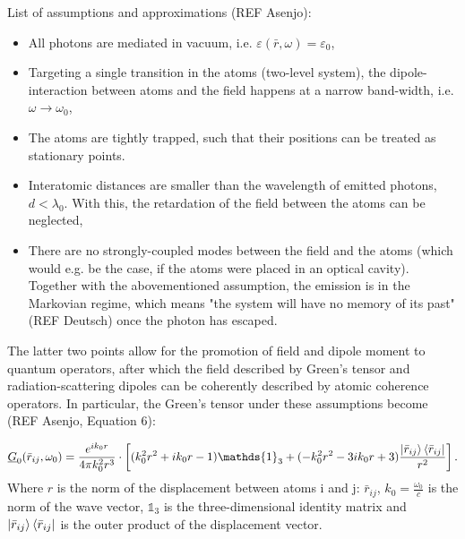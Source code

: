 \documentclass{article}
\begin{document}
List of assumptions and approximations (REF Asenjo):
\begin{itemize}\label{list:assumptions}
    \item All photons are mediated in vacuum, i.e. $\varepsilon(\bar{r},\omega) = \varepsilon_0$,
    \item Targeting a single transition in the atoms (two-level system), the dipole-interaction between atoms and the field happens at a narrow band-width, i.e. $\omega \rightarrow \omega_0$,
    \item The atoms are tightly trapped, such that their positions can be treated as stationary points. 
    \item Interatomic distances are smaller than the wavelength of emitted photons, $d < \lambda_0$. With this, the retardation of the field between the atoms can be neglected, 
    \item There are no strongly-coupled modes between the field and the atoms (which would e.g. be the case, if the atoms were placed in an optical cavity). Together with the abovementioned assumption, the emission is in the Markovian regime, which means "the system will have no memory of its past" (REF Deutsch) once the photon has escaped. 
\end{itemize}
The latter two points allow for the promotion of field and dipole moment to quantum operators, after which the field described by Green's tensor and radiation-scattering dipoles can be coherently described by atomic coherence operators. In particular, the Green's tensor under these assumptions become (REF Asenjo, Equation 6):

\begin{equation}\label{eq:Greens}
    \underline{G}_0 (\bar{r}_{ij}, \omega_0) = \frac{e^{ik_0r}}{4\pi k_0^2 r^3} \cdot \left[ (k_0^2r^2 + ik_0r - 1) \mathds{1}_3 + (-k_0^2 r^2 -3ik_0r + 3) \frac{\ket{\bar{r}_{ij}}\bra{\bar{r}_{ij}}}{r^2} \right].
\end{equation}
Where $r$ is the norm of the displacement between atoms i and j: $\bar{r}_{ij}$, $k_0=\frac{\omega_0}{c}$ is the norm of the wave vector, $\mathds{1}_3$ is the three-dimensional identity matrix and $\ket{\bar{r}_{ij}}\bra{\bar{r}_{ij}}$ is the outer product of the displacement vector. 
\end{document}
